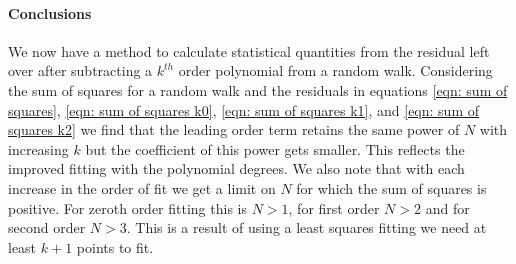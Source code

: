 \paragraph{Conclusions}
We now have a method to calculate statistical quantities from the residual 
left over after subtracting a $k^{th}$ order polynomial from a random walk. 
Considering the sum of squares for a random walk and the residuals in equations
\eqref{eqn: sum of squares}, \eqref{eqn: sum of squares k0},
\eqref{eqn: sum of squares k1}, and \eqref{eqn: sum of squares k2} we find that
the leading order term retains the same
power of $N$ with increasing $k$ but the coefficient of this power gets
smaller. This reflects the improved fitting with the polynomial degrees. We
also note that with each increase in the order of fit we get a limit 
on $N$ for which the sum of squares is positive. For zeroth order fitting this 
is $N>1$, for first order $N>2$ and for second order $N>3$. This is a result 
of using a least squares fitting we need at least $k+1$ points to fit.
